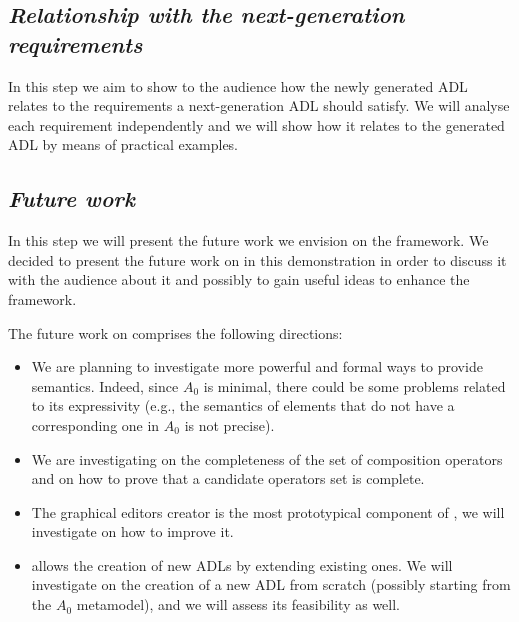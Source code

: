 \subsection{\em Relationship with the next-generation requirements}
In this step we aim to show to the audience how the newly generated ADL
relates to the requirements a next-generation ADL should satisfy.
We will analyse each requirement independently and we will show how it relates to the generated ADL
by means of practical examples.


\subsection{\em Future work}
In this step we will present the future work we envision on the \name{} framework.
We decided to present the future work on \name{} in this demonstration in order
to discuss it with the audience about it and possibly to gain useful ideas to
enhance the framework.

The future work on \name{} comprises the following directions:
\begin{itemize}
    \item We are planning to investigate more powerful and formal ways to provide semantics.
    Indeed, since $A_0$ is minimal, there could be some problems related
    to its expressivity (e.g., the semantics of elements that do not have a corresponding one in $A_0$ is
    not precise).
    \item
    We are investigating on the completeness of the
    set of composition operators and on how to prove that a candidate operators set is complete.
    \item The graphical editors creator is the most prototypical component of \name{},
    we will investigate on how to improve it.
    \item \name{} allows the creation of new ADLs by extending existing ones. We will investigate on the creation of a
    new ADL from scratch (possibly starting from the $A_0$ metamodel), and we will assess its feasibility as well.
\end{itemize}

